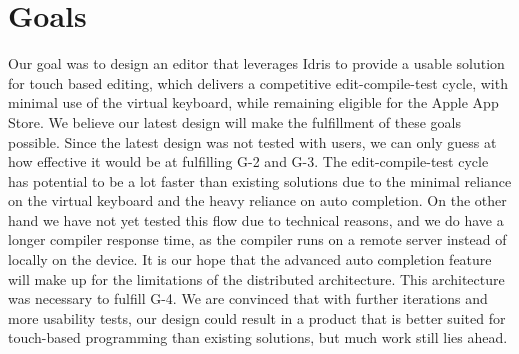 \section{Goals}
Our goal was to design an editor that leverages Idris to provide a usable solution for touch based editing, which delivers a competitive edit-compile-test cycle, with minimal use of the virtual keyboard, while remaining eligible for the Apple App Store.
We believe our latest design will make the fulfillment of these goals possible. 
Since the latest design was not tested with users, we can only guess at how effective
it would be at fulfilling G-2 and G-3. The edit-compile-test cycle has potential to be a lot faster than existing solutions due to the minimal reliance
on the virtual keyboard and the heavy reliance on auto completion. On the other
hand we have not yet tested this flow due to technical reasons, and we do have
a longer compiler response time, as the compiler runs on a remote server
instead of locally on the device. It is our hope that the advanced auto
completion feature will make up for the limitations of the distributed
architecture. This architecture was necessary to fulfill G-4.
We are convinced that with further iterations and more usability tests, our design could result in a product that is better suited for touch-based programming than existing solutions, but much work still lies ahead.

